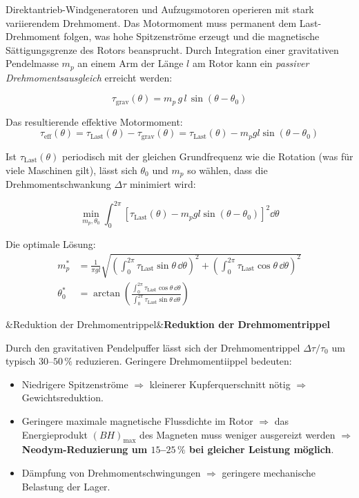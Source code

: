 ﻿\documentclass[12pt, a4paper]{report}
\newenvironment{ergebnis}[1][]{%
  \begin{ergebnisframe}\sloppy%
  \ifx&#1&\else\textbf{#1}\par\smallskip\fi}{\end{ergebnisframe}}
\theoremstyle{definition}
\theoremstyle{remark}
\begin{document}
Direktantrieb-Windgeneratoren und Aufzugsmotoren operieren mit stark
variierendem Drehmoment. Das Motormoment muss permanent dem Last-Drehmoment
folgen, was hohe Spitzenströme erzeugt und die magnetische Sättigungsgrenze
des Rotors beansprucht. Durch Integration einer gravitativen Pendelmasse
$m_p$ an einem Arm der Länge $l$ am Rotor kann ein \emph{passiver
Drehmomentsausgleich} erreicht werden:

\begin{equation}
  \tau_{\text{grav}}(\theta) = m_p \, g \, l \, \sin(\theta - \theta_0)
  \label{eq:tau_grav_pendel}
\end{equation}

Das resultierende effektive Motormoment:
\begin{equation}
  \tau_{\text{eff}}(\theta) = \tau_{\text{Last}}(\theta) - \tau_{\text{grav}}(\theta)
  = \tau_{\text{Last}}(\theta) - m_p g l \sin(\theta - \theta_0)
  \label{eq:tau_eff}
\end{equation}

Ist $\tau_{\text{Last}}(\theta)$ periodisch mit der gleichen Grundfrequenz wie
die Rotation (was für viele Maschinen gilt), lässt sich $\theta_0$ und $m_p$
so wählen, dass die Drehmomentschwankung $\Delta\tau$ minimiert wird:

\begin{equation}
  \min_{m_p, \theta_0}
  \int_0^{2\pi}\!\left[\tau_{\text{Last}}(\theta) - m_p g l\sin(\theta-\theta_0)\right]^2\dd\theta
  \label{eq:optim_pendel}
\end{equation}

Die optimale Lösung:
\begin{align}
  m_p^* &= \frac{1}{\pi g l}
    \sqrt{\left(\int_0^{2\pi}\!\tau_{\text{Last}}\sin\theta\,\dd\theta\right)^2
         +\left(\int_0^{2\pi}\!\tau_{\text{Last}}\cos\theta\,\dd\theta\right)^2}
  \label{eq:mp_opt} \\
  \theta_0^* &= \arctan\!\left(\frac{\int_0^{2\pi}\!\tau_{\text{Last}}\cos\theta\,\dd\theta}
                                    {\int_0^{2\pi}\!\tau_{\text{Last}}\sin\theta\,\dd\theta}\right)
  \label{eq:theta0_opt}
\end{align}

\begin{ergebnis}[Reduktion der Drehmomentrippel]
  Durch den gravitativen Pendelpuffer lässt sich der Drehmomentrippel
  $\Delta\tau / \tau_0$ um typisch $30$--$50\,\%$ reduzieren. Geringere
  Drehmomentiippel bedeuten:
  \begin{itemize}
    \item Niedrigere Spitzenströme $\Rightarrow$ kleinerer Kupferquerschnitt
          nötig $\Rightarrow$ Gewichtsreduktion.
    \item Geringere maximale magnetische Flussdichte im Rotor $\Rightarrow$
          das Energieprodukt $(BH)_{\max}$ des Magneten muss weniger ausgereizt
          werden $\Rightarrow$ \textbf{Neodym-Reduzierung um $15$--$25\,\%$
          bei gleicher Leistung möglich}.
    \item Dämpfung von Drehmomentschwingungen $\Rightarrow$ geringere mechanische
          Belastung der Lager.
  \end{itemize}
\end{ergebnis}
\end{document}
